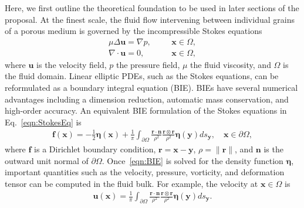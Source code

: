 \documentclass[11pt]{article}
\newcommand{\bvec}[1]{{\mathbf{#1}}}
\newcommand{\grad}{\nabla}
\newcommand{\uu}{\bvec{u}}
\newcommand{\xx}{\bvec{x}}
\newcommand{\nn}{{\mathbf{n}}}
\newcommand{\bd}{\partial}
\newcommand{\eeta}{\boldsymbol{\eta}}
\newcommand{\rr}{\mathbf{r}}
\newcommand{\ff}{\mathbf{f}}
\newcommand{\yy}{\mathbf{y}}
\begin{document}
Here, we first outline the theoretical foundation to be used in later sections of the proposal. At the finest scale, the fluid flow intervening between individual grains of a porous medium is governed by the incompressible Stokes equations \begin{equation}
\label{eqn:StokesEq}
\begin{split}
\mu \Delta \uu = \grad p,	&\hspace{20pt} \xx \in \Omega, \\
\grad \cdot \uu = 0, 		&\hspace{20pt} \xx \in \Omega,
\end{split}
\end{equation}
where $\uu$ is the velocity field, $p$ the pressure field, $\mu$ the
fluid viscosity, and $\Omega$ is the fluid domain. Linear elliptic PDEs,
such as the Stokes equations, can be reformulated as a boundary integral
equation (BIE).  BIEs have several numerical advantages including a
dimension reduction, automatic mass conservation, and high-order
accuracy. An equivalent BIE formulation of the Stokes equations in
Eq.~\eqref{eqn:StokesEq} is
\begin{align}
  \label{eqn:BIE}
  \ff(\xx) = -\frac{1}{2}\eeta(\xx) + \frac{1}{\pi} \int_{\bd\Omega}
    \frac{\rr \cdot \nn}{\rho^2} \frac{\rr \otimes \rr}{\rho^2}
    \eeta(\yy) ds_\yy, \quad \xx \in \bd\Omega,
\end{align}
where $\ff$ is a Dirichlet boundary condition, $\rr = \xx - \yy$, $\rho = \|\rr\|$, and $\nn$ is the outward unit normal of $\bd\Omega$.  Once~\eqref{eqn:BIE} is solved for the density function $\eeta$, important quantities such as the velocity, pressure, vorticity, and deformation tensor can be computed in the fluid bulk.  For example, the velocity at $\xx \in \Omega$ is 
\begin{align}
  \uu(\xx) = \frac{1}{\pi} \int_{\bd\Omega}
    \frac{\rr \cdot \nn}{\rho^2} \frac{\rr \otimes \rr}{\rho^2}
    \eeta(\yy) ds_\yy.
\end{align}
\end{document}
